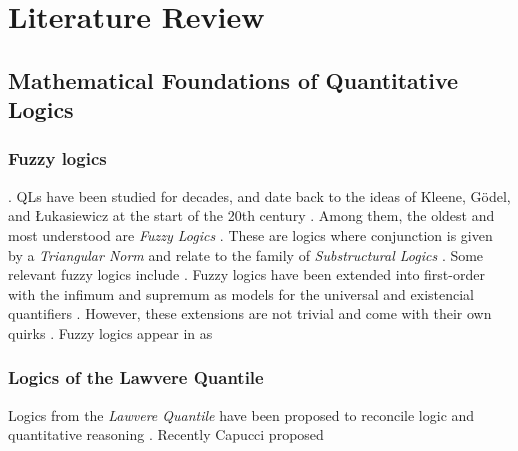 \chapter{Literature Review} \label{Chapter:LiteratureReview}



\section{Mathematical Foundations of Quantitative Logics}
\subsection{Fuzzy logics}
\yada. QLs have been studied for decades, and date back to the ideas of Kleene, G\"{o}del, and Łukasiewicz at the start of the 20th century \citep{cintula2011handbook, prooffuzzy}. Among them, the oldest and most understood are \emph{Fuzzy Logics} \citep{cintula2011handbook, prooffuzzy}. These are logics where conjunction is given by a \emph{Triangular Norm} \cite{cintula2011handbook, prooffuzzy} 
and relate to the family of \emph{Substructural Logics} \citep{galatos2007residuated}. Some relevant fuzzy logics include \yada. Fuzzy logics have been extended into first-order with the infimum and supremum as models for the universal and existencial quantifiers \mcita{}. However, these extensions are not trivial and come with their own quirks \yada.
Fuzzy logics appear in \AI{} as \yada
{}

\subsection{Logics of the Lawvere Quantile}

Logics from the \emph{Lawvere Quantile} \mcita{} have been proposed to reconcile logic and quantitative reasoning \yada. Recently Capucci proposed \yada 

